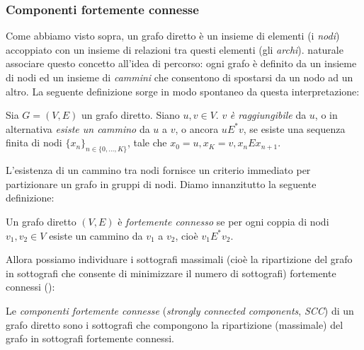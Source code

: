 \subsubsection{Componenti fortemente connesse}
Come abbiamo visto sopra, un grafo diretto è un insieme di elementi (i \emph{nodi}) accoppiato con un insieme di relazioni tra questi elementi (gli \emph{archi}). \accente naturale associare questo concetto all'idea di percorso: ogni grafo è definito da un insieme di nodi ed un insieme di \emph{cammini} che consentono di spostarsi da un nodo ad un altro. La seguente definizione sorge in modo spontaneo da questa interpretazione:
\begin{definition}
    Sia $G = (V, E)$ un grafo diretto. Siano $u,v \in V$. $v$ \emph{è raggiungibile} da $u$, o in alternativa \emph{esiste un cammino} da $u$ a $v$, o ancora $u E^{*} v$, se esiste una sequenza finita di nodi $\displaystyle \{x_n\}_{n \in \{0,\dots,K\}}$, tale che $x_0 = u, x_K = v, x_n E x_{n+1}$.
\end{definition}
L'esistenza di un cammino tra nodi fornisce un criterio immediato per partizionare un grafo in gruppi di nodi. Diamo innanzitutto la seguente definizione:
\begin{definition}
    Un grafo diretto $(V,E)$ è \emph{fortemente connesso} se per ogni coppia di nodi $v_1, v_2 \in V$ esiste un cammino da $v_1$ a $v_2$, cioè $v_1 E^{*} v_2$.
\end{definition}
Allora possiamo individuare i sottografi massimali (cioè la ripartizione del grafo in sottografi che consente di minimizzare il numero di sottografi) fortemente connessi (\hspace*{-0.1cm}\cite[Appendice B]{clrs}):
\begin{definition}
    Le \emph{componenti fortemente connesse} (\emph{strongly connected components}, \emph{SCC}) di un grafo diretto sono i sottografi che compongono la ripartizione (massimale) del grafo in sottografi fortemente connessi.
\end{definition}
